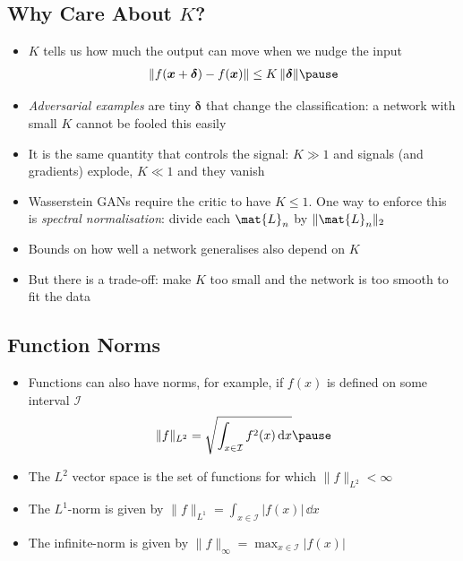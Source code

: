 \begin{slide}
\section[-2]{Why Care About $K$?}

\begin{PauseHighLight}\small
  \begin{itemize}\squeeze
  \item $K$ tells us how much the output can move when we nudge the
    input
    \begin{align*}
      \len{f(\bm{x}+\bm{\delta}) - f(\bm{x})} \leq K \, \len{\bm{\delta}}\pause
    \end{align*}
  \item \emph{Adversarial examples} are tiny $\bm{\delta}$ that change
    the classification: a network with small $K$ cannot be fooled this
    easily\pause
  \item It is the same quantity that controls the signal: $K\gg1$ and
    signals (and gradients) explode, $K\ll1$ and they vanish\pause
  \item Wasserstein GANs require the critic to have $K\leq1$.  One way to
    enforce this is \emph{spectral normalisation}: divide each
    $\mat{L}_n$ by $\len{\mat{L}_n}_2$\pause
  \item Bounds on how well a network generalises also depend on
    $K$\pause
  \item But there is a trade-off: make $K$ too small and the network
    is too smooth to fit the data\pause
  \end{itemize}
\end{PauseHighLight}

\end{slide}


\begin{slide}
\section[-1]{Function Norms}

\begin{PauseHighLight}
  \begin{itemize}
  \item Functions can also have norms, for example, if $f(x)$ is defined
    on some interval $\mathcal{I}$ {\small
    \begin{align*}
      \| f \|_{L^2} = \sqrt{\int_{x\in\mathcal{I}} f^2(x) \, \dd x}\pause
    \end{align*}}
  \item The $L^2$ vector space is the set of functions for which $\|
    f \|_{L^2}<\infty$\pause
  \item The $L^1$-norm is given by
    $\| f \|_{L^1} = \int_{x\in\mathcal{I}} |f(x)| \, \dd x$\pause
  \item The infinite-norm is given by
    $\| f \|_{\infty} = \max_{x\in\mathcal{I}} |f(x)|$\pause
  \end{itemize}
\end{PauseHighLight}

\end{slide}

